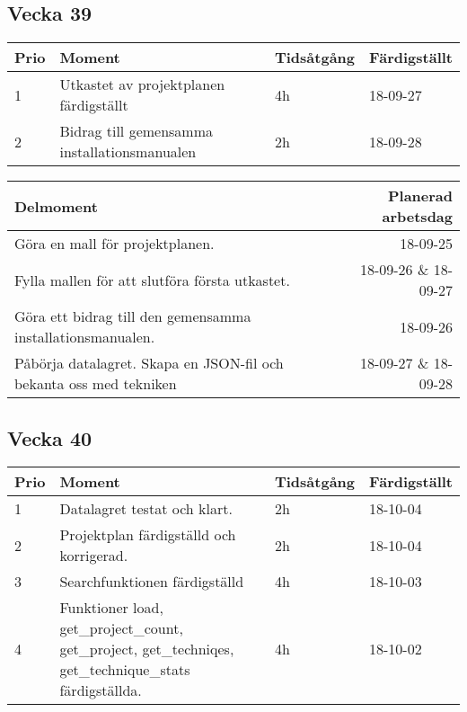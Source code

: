\documentclass{TDP003mall}
\begin{document}
\subsection{Vecka 39}
\begin{table}[!h]
\begin{tabularx}{\linewidth}{|l|X|l|l|}
\hline
\textbf{Prio} & \textbf{Moment} & \textbf{Tidsåtgång} & \textbf{Färdigställt}\\\hline
1& Utkastet av projektplanen färdigställt & 4h	& 18-09-27 \\\hline
2& Bidrag till gemensamma installationsmanualen & 2h &  18-09-28 \\\hline
\end{tabularx}
\end{table}

\begin{table}[!h]
\begin{tabularx}{\linewidth}{|X|r|}\hline
    \textbf{Delmoment} & \textbf{ Planerad arbetsdag} \\\hline
    Göra en mall för projektplanen. & 18-09-25 \\\hline
    Fylla mallen för att slutföra första utkastet. & 18-09-26 \& 18-09-27 \\\hline
    Göra ett bidrag till den gemensamma installationsmanualen. & 18-09-26 \\\hline
    Påbörja datalagret. Skapa en JSON-fil och bekanta oss med tekniken & 18-09-27 \& 18-09-28 \\\hline
\end{tabularx}
\end{table}
\subsection{Vecka 40}
\begin{table}[!h]
\begin{tabularx}{\linewidth}{|l|X|l|l|}\hline
\textbf{Prio} & \textbf{Moment} & \textbf{Tidsåtgång} & \textbf{Färdigställt}\\\hline
1& Datalagret testat och klart. & 2h & 18-10-04 \\\hline
2& Projektplan färdigställd och korrigerad. & 2h & 18-10-04 \\\hline
3& Searchfunktionen färdigställd & 4h & 18-10-03 \\\hline
4& Funktioner load, get\_project\_count, get\_project, get\_techniqes, get\_technique\_stats färdigställda. & 4h & 18-10-02 \\\hline
\end{tabularx}
\end{table}
\end{document}
